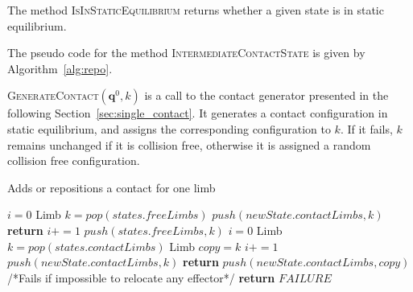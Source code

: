 The method \textsc{IsInStaticEquilibrium} returns whether a given state is in static equilibrium.

The pseudo code for the method \textsc{IntermediateContactState} is given by Algorithm~\ref{alg:repo}.


\textsc{GenerateContact}$(\mathbf{q}^0,k)$ is a call to the contact generator presented in the following Section~\ref{sec:single_contact}.
 It generates a contact configuration in static equilibrium, and assigns the corresponding configuration to $k$.
If it fails, $k$ remains unchanged if it is collision free, otherwise it is assigned a random collision free configuration.



\begin{algorithm}[!tbp]
\caption{Adds or repositions a contact for one limb} \label{interpolate}
	\begin{algorithmic}[1]
		\State $i=0$
			\State Limb $k = pop(states.freeLimbs)$
				\State $push(newState.contactLimbs,k)$			
				\State \textbf{return}
			\Else
				\State $i+=1$
				\State $push(states.freeLimbs,k)$		
			\EndIf
		\EndWhile
		\State $i=0$
			\State Limb $k = pop(states.contactLimbs)$
			\State Limb $copy = k$
			\State $i+=1$
				\State $push(newState.contactLimbs,k)$			
				\State \textbf{return}
			\Else
				\State $push(newState.contactLimbs,copy)$	
			\EndIf
		\EndWhile
		/*Fails if impossible to relocate any effector*/
		\State \textbf{return} $FAILURE$
	\EndFunction
\end{algorithmic}
\label{alg:repo}
\end{algorithm}

